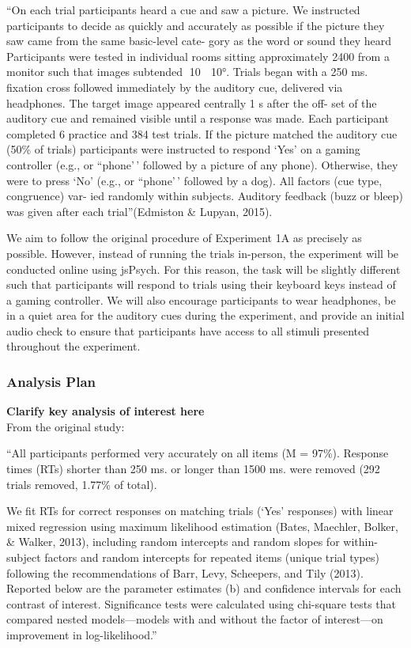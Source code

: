 \documentclass[
  letterpaper,
  DIV=11,
  numbers=noendperiod]{scrartcl}
\begin{document}
``On each trial participants heard a cue and saw a picture. We
instructed participants to decide as quickly and accurately as possible
if the picture they saw came from the same basic-level cate- gory as the
word or sound they heard Participants were tested in individual rooms
sitting approximately 2400 from a monitor such that images subtended 10 
10°. Trials began with a 250 ms. fixation cross followed immediately by
the auditory cue, delivered via headphones. The target image appeared
centrally 1 s after the off- set of the auditory cue and remained
visible until a response was made. Each participant completed 6 practice
and 384 test trials. If the picture matched the auditory cue (50\% of
trials) participants were instructed to respond `Yes' on a gaming
controller (e.g., or ``phone'\,' followed by a picture of any phone).
Otherwise, they were to press `No' (e.g., or ``phone'\,' followed by a
dog). All factors (cue type, congruence) var- ied randomly within
subjects. Auditory feedback (buzz or bleep) was given after each
trial''(Edmiston \& Lupyan, 2015).

We aim to follow the original procedure of Experiment 1A as precisely as
possible. However, instead of running the trials in-person, the
experiment will be conducted online using jsPsych. For this reason, the
task will be slightly different such that participants will respond to
trials using their keyboard keys instead of a gaming controller. We will
also encourage participants to wear headphones, be in a quiet area for
the auditory cues during the experiment, and provide an initial audio
check to ensure that participants have access to all stimuli presented
throughout the experiment.

\subsubsection{Analysis Plan}\label{analysis-plan}

\textbf{Clarify key analysis of interest here}\\
From the original study:

``All participants performed very accurately on all items (M = 97\%).
Response times (RTs) shorter than 250 ms. or longer than 1500 ms. were
removed (292 trials removed, 1.77\% of total).

We fit RTs for correct responses on matching trials (`Yes' responses)
with linear mixed regression using maximum likelihood estimation (Bates,
Maechler, Bolker, \& Walker, 2013), including random intercepts and
random slopes for within-subject factors and random intercepts for
repeated items (unique trial types) following the recommendations of
Barr, Levy, Scheepers, and Tily (2013). Reported below are the parameter
estimates (b) and confidence intervals for each contrast of interest.
Significance tests were calculated using chi-square tests that compared
nested models---models with and without the factor of interest---on
improvement in log-likelihood.''
\end{document}
